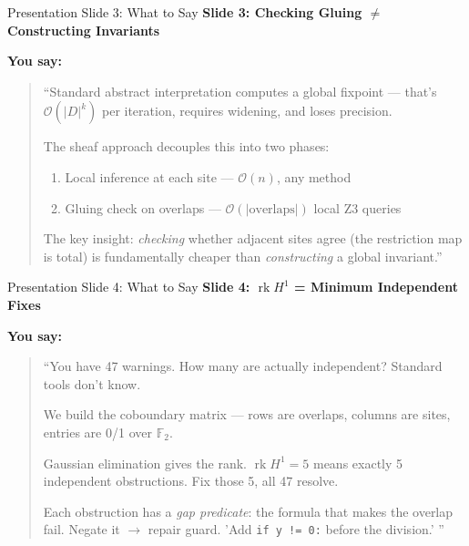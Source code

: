 \documentclass[aspectratio=169,10pt]{beamer}
\newcommand{\rk}{\operatorname{rk}}
\begin{document}
\begin{frame}{Presentation Slide 3: What to Say}
\textbf{Slide 3: Checking Gluing $\neq$ Constructing Invariants}

\textbf{You say:}
\begin{quote}
``Standard abstract interpretation computes a global fixpoint --- that's $\mathcal{O}(|D|^k)$ per iteration, requires widening, and loses precision.

The sheaf approach decouples this into two phases:
\begin{enumerate}
  \item Local inference at each site --- $\mathcal{O}(n)$, any method
  \item Gluing check on overlaps --- $\mathcal{O}(|\text{overlaps}|)$ local Z3 queries
\end{enumerate}

The key insight: \emph{checking} whether adjacent sites agree (the restriction map is total) is fundamentally cheaper than \emph{constructing} a global invariant.''
\end{quote}
\end{frame}

\begin{frame}{Presentation Slide 4: What to Say}
\textbf{Slide 4: $\rk H^1$ = Minimum Independent Fixes}

\textbf{You say:}
\begin{quote}
``You have 47 warnings. How many are actually independent? Standard tools don't know.

We build the coboundary matrix --- rows are overlaps, columns are sites, entries are 0/1 over $\mathbb{F}_2$.

Gaussian elimination gives the rank. $\rk H^1 = 5$ means exactly 5 independent obstructions. Fix those 5, all 47 resolve.

Each obstruction has a \emph{gap predicate}: the formula that makes the overlap fail. Negate it $\to$ repair guard. 'Add \texttt{if y != 0:} before the division.' ''
\end{quote}
\end{frame}
\end{document}
